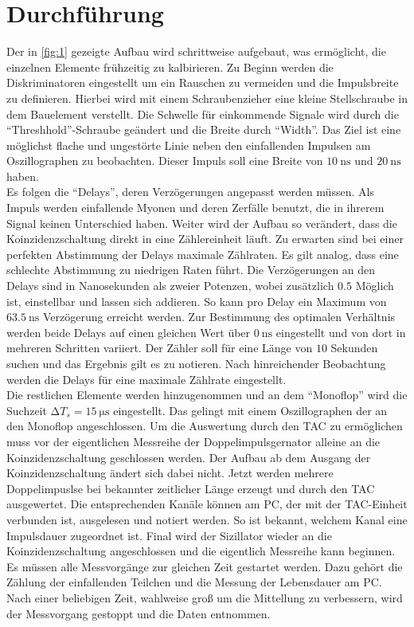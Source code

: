 \newpage
\section{Durchführung}
Der in \ref{fig:1} gezeigte Aufbau wird schrittweise aufgebaut, was ermöglicht, die einzelnen Elemente
frühzeitig zu kalbirieren. Zu Beginn werden die Diskriminatoren eingestellt um ein Rauschen zu vermeiden und die Impulsbreite zu definieren.
Hierbei wird mit einem Schraubenzieher eine kleine Stellschraube in dem Bauelement verstellt. Die Schwelle für einkommende Signale
wird durch die \enquote{Threshhold}-Schraube geändert und die Breite durch \enquote{Width}. Das Ziel ist eine möglichst flache und ungestörte Linie 
neben den einfallenden Impulsen am Oszillographen zu beobachten. Dieser Impuls soll eine Breite von $\SI{10}{\nano\second}$ und $\SI{20}{\nano\second}$ haben.
\\
\newline
Es folgen die \enquote{Delays}, deren Verzögerungen angepasst werden müssen. Als Impuls werden einfallende Myonen und deren Zerfälle 
benutzt, die in ihrerem Signal keinen Unterschied haben. Weiter wird der Aufbau so verändert, dass die Koinzidenzschaltung direkt in eine Zählereinheit läuft. 
Zu erwarten sind bei einer perfekten Abstimmung der Delays maximale Zählraten. Es gilt analog, dass eine schlechte Abstimmung zu niedrigen Raten führt. 
Die Verzögerungen an den Delays sind in Nanosekunden als zweier Potenzen, wobei zusätzlich $0.5$ Möglich ist, einstellbar und lassen sich addieren. So kann pro Delay
ein Maximum von $\SI{63.5}{\nano\second}$ Verzögerung erreicht werden. Zur Bestimmung des optimalen Verhältnis werden beide Delays auf einen gleichen Wert über $\SI{0}{\nano\second}$ eingestellt und von dort 
in mehreren Schritten variiert. Der Zähler soll für eine Länge von $10$ Sekunden suchen und das Ergebnis gilt es zu notieren.
Nach hinreichender Beobachtung werden die Delays für eine maximale Zählrate eingestellt.
\\
\newline
Die restlichen Elemente werden hinzugenommen und an dem \enquote{Monoflop} wird die Suchzeit $\increment T_s = \SI{15}{\micro\second}$ eingestellt. 
Das gelingt mit einem Oszillographen der an den Monoflop angeschlossen.
Um die Auswertung durch den TAC zu ermöglichen muss vor der eigentlichen Messreihe der Doppelimpulsgernator alleine an die Koinzidenzschaltung
geschlossen werden. Der Aufbau ab dem Ausgang der Koinzidenzschaltung ändert sich dabei nicht. 
Jetzt werden mehrere Doppelimpuslse bei bekannter zeitlicher Länge erzeugt und durch den TAC ausgewertet. Die entsprechenden Kanäle können am PC, der mit der TAC-Einheit verbunden ist, 
ausgelesen und notiert werden. So ist bekannt, welchem Kanal eine Impulsdauer zugeordnet ist. 
Final wird der Sizillator wieder an die Koinzidenzschaltung angeschlossen und die eigentlich Messreihe kann beginnen. 
Es müssen alle Messvorgänge zur gleichen Zeit gestartet werden. Dazu gehört die Zählung der einfallenden Teilchen und die Messung der Lebensdauer am PC.
Nach einer beliebigen Zeit, wahlweise groß um die Mittellung zu verbessern, wird der Messvorgang gestoppt und die Daten entnommen.